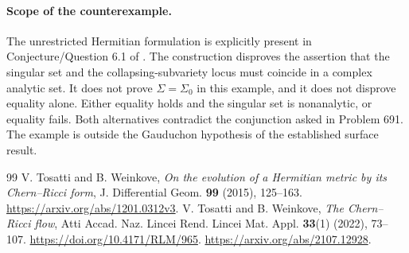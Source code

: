 \documentclass[11pt,a4paper]{article}
\theoremstyle{remark}
\begin{document}
\paragraph{Scope of the counterexample.}
The unrestricted Hermitian formulation is explicitly present in Conjecture/Question 6.1 of \cite{TosattiWeinkove2022}. The construction disproves the assertion that the singular set and the collapsing-subvariety locus must coincide in a complex analytic set. It does not prove $\Sigma=\Sigma_0$ in this example, and it does not disprove equality alone. Either equality holds and the singular set is nonanalytic, or equality fails. Both alternatives contradict the conjunction asked in Problem 691. The example is outside the Gauduchon hypothesis of the established surface result.

\begingroup\small
\begin{thebibliography}{99}
 V. Tosatti and B. Weinkove, \emph{On the evolution of a Hermitian metric by its Chern--Ricci form}, J. Differential Geom. \textbf{99} (2015), 125--163. \url{https://arxiv.org/abs/1201.0312v3}.
 V. Tosatti and B. Weinkove, \emph{The Chern--Ricci flow}, Atti Accad. Naz. Lincei Rend. Lincei Mat. Appl. \textbf{33}(1) (2022), 73--107. \url{https://doi.org/10.4171/RLM/965}. \url{https://arxiv.org/abs/2107.12928}.
\end{thebibliography}
\endgroup
\end{document}
